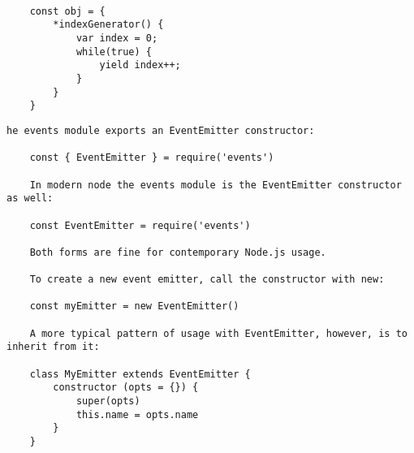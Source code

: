 \documentclass{scrartcl}
\begin{document}
\begin{lstlisting}[style=ES6]

    const obj = {
        *indexGenerator() {
            var index = 0;
            while(true) {
                yield index++;
            }
        }
    }

\end{lstlisting}


\begin{lstlisting}[style=ES6]
    he events module exports an EventEmitter constructor:

    const { EventEmitter } = require('events')

    In modern node the events module is the EventEmitter constructor as well:

    const EventEmitter = require('events')

    Both forms are fine for contemporary Node.js usage.

    To create a new event emitter, call the constructor with new:

    const myEmitter = new EventEmitter()

    A more typical pattern of usage with EventEmitter, however, is to inherit from it:

    class MyEmitter extends EventEmitter {
        constructor (opts = {}) {
            super(opts)
            this.name = opts.name
        }
    }

\end{lstlisting}

\begin{lstlisting}[style=ES6]

\end{lstlisting}

\begin{lstlisting}[style=ES6]

\end{lstlisting}

\begin{lstlisting}[style=ES6]

\end{lstlisting}
\end{document}
